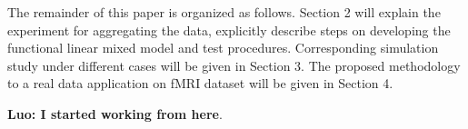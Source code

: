 \documentclass[12pt]{article}
\def\luo#1{{\bf \color{red} Luo: \color{blue} #1}}
\begin{document}
The remainder of this paper is organized as follows. Section 2 will explain the experiment for aggregating the data, explicitly describe steps on developing the functional linear mixed model and test procedures. Corresponding simulation study under different cases will be given in Section 3. The proposed methodology to a real data application on fMRI dataset will be given in Section 4. 

\luo{I started working from here}.


\newpage

\newpage


\newpage

\end{document}

